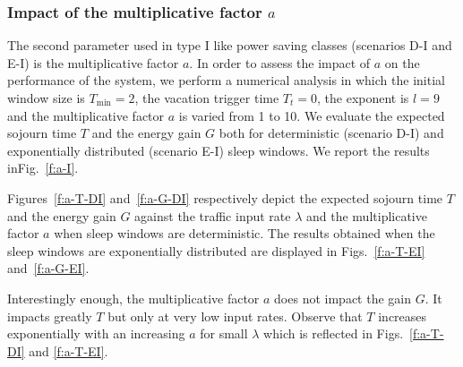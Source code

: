 \documentclass[journal]{IEEEtran}
\begin{document}
\subsubsection{Impact of the multiplicative factor $a$}
\label{s:a}
The second parameter used in type I like power saving classes (scenarios D-I and E-I) is the multiplicative factor $a$. In order to assess the impact of $a$ on the performance of the system, we perform a numerical analysis in which the initial window size is $T_{\min}=2$, the vacation trigger time $T_t=0$, the exponent is $l=9$ and the multiplicative factor $a$ is varied from 1 to 10. We evaluate the expected sojourn time $T$ and the energy gain $G$ both for deterministic (scenario D-I) and exponentially distributed (scenario E-I) sleep windows. We report the results inFig.~\ref{f:a-I}.
\begin{figure*}[tb]
\begin{center}
\caption{Impact of $a$ on $T$ and $G$ with either deterministic or exponential $\{S_i\}_i$.
\label{f:a-I}}
\end{center}
\end{figure*}
Figures~\ref{f:a-T-DI} and~\ref{f:a-G-DI} respectively depict the expected sojourn time $T$ and the energy gain $G$ against the traffic input rate $\lambda$ and the multiplicative factor $a$ when sleep windows are deterministic. The results obtained when the sleep windows are exponentially distributed are displayed in Figs.~\ref{f:a-T-EI} and~\ref{f:a-G-EI}. 

Interestingly enough, the multiplicative factor $a$ does not impact the gain $G$. It impacts greatly $T$ but only at very low input rates. Observe that $T$ increases exponentially with an increasing $a$ for small
$\lambda$ which is reflected in Figs.~\ref{f:a-T-DI} and \ref{f:a-T-EI}. 
\end{document}
